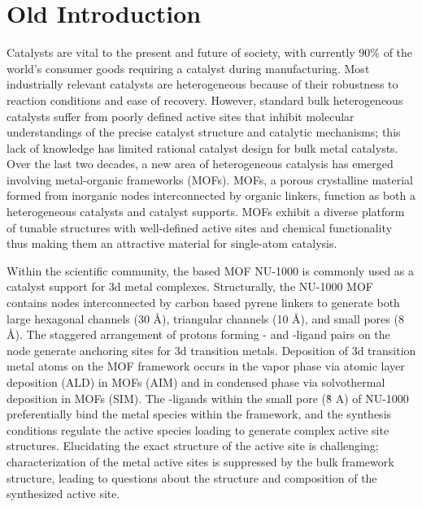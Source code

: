 
\section{Old Introduction}
Catalysts are vital to the present and future of society, with currently 90\% of the world's consumer goods requiring a catalyst during manufacturing.\cite{Hagen2015} Most industrially relevant catalysts are heterogeneous because of their robustness to reaction conditions and ease of recovery. However, standard bulk heterogeneous catalysts suffer from poorly defined active sites that inhibit molecular understandings of the precise catalyst structure and catalytic mechanisms; this lack of knowledge has limited rational catalyst design for bulk metal catalysts. Over the last two decades, a new area of heterogeneous catalysis has emerged involving metal-organic frameworks (MOFs). MOFs, a porous crystalline material formed from inorganic nodes interconnected by organic linkers, function as both a heterogeneous catalysts\cite{Vitillo2019, Hicks2020} and catalyst supports.\cite{Cui2018, Noh2016, Li2017, Song2019, Nguyen2015} MOFs exhibit a diverse platform of tunable structures with well-defined active sites and chemical functionality thus making them an attractive material for single-atom catalysis. 

Within the scientific community, the  based MOF NU-1000 is commonly used as a catalyst support for 3d metal complexes.\cite{Shabbir2020, Hackler2020, Ortuno2016, Pellizzeri2018} Structurally, the NU-1000 MOF contains  nodes interconnected by carbon based pyrene linkers to generate both large hexagonal channels (30 {\AA}), triangular channels (10 {\AA}), and small pores (8 {\AA}). The staggered arrangement of protons forming - and -ligand pairs on the node generate anchoring sites for 3d transition metals.\cite{Planas2014} Deposition of 3d transition metal atoms on the MOF framework occurs in the vapor phase via atomic layer deposition (ALD) in MOFs (AIM) \cite{Mondloch2013} and in condensed phase via solvothermal deposition in MOFs (SIM).\cite{Noh2016} The -ligands within the small pore (\~8 A) of NU-1000 preferentially bind the metal species within the framework,\cite{Gallington2016, Rimoldi2017} and the synthesis conditions regulate the active species loading to generate complex active site structures.\cite{Kim2015} Elucidating the exact structure of the active site is challenging; characterization of the metal active sites is suppressed by the bulk framework structure, leading to questions about the structure and composition of the synthesized active site.

